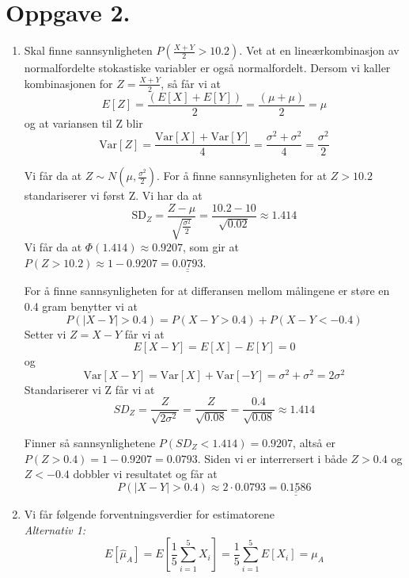 \documentclass[a4paper,11pt,norsk]{article}
\begin{document}
\section*{Oppgave 2.}
\begin{enumerate}
    \item Skal finne sannsynligheten $P(\frac{X + Y}{2} > 10.2)$. Vet at en lineærkombinasjon av normalfordelte stokastiske variabler er også normalfordelt. 
        Dersom vi kaller kombinasjonen for $Z = \frac{X + Y}{2}$, så får vi at
        \[
            E[Z] = \frac{\left(E[X] + E[Y]\right)}{2} = \frac{\left(\mu + \mu\right)}{2} = \mu
        \]
        og at variansen til Z blir
        \[
            \text{Var}[Z] = \frac{\text{Var}[X] + \text{Var}[Y]}{4} = \frac{\sigma^2 + \sigma^2}{4} = \frac{\sigma^2}{2}
        \]

        Vi får da at $Z \sim N(\mu, \frac{\sigma^2}{2})$. For å finne sannsynligheten for at $Z > 10.2$ standariserer vi først 
        Z. Vi har da at
        \[
            \text{SD}_Z = \frac{Z - \mu}{\sqrt{\frac{\sigma^2}{2}}} = \frac{10.2 - 10}{\sqrt{0.02}} \approx 1.414
        \]
        Vi får da at $\Phi(1.414) \approx 0.9207$, som gir at $P(Z > 10.2) \approx 1 - 0.9207 = \underline{\underline{0.0793}}$.
    
        For å finne sannsynligheten for at differansen mellom målingene er støre en 0.4 gram benytter vi at 
        \[
            P(|X - Y| > 0.4) = P(X - Y > 0.4) + P(X - Y < -0.4)
        \]
        Setter vi $Z = X - Y$ får vi at
        \[
            E[X - Y] = E[X] - E[Y] = 0
        \]
        og 
        \[
            \text{Var}[X - Y] = \text{Var}[X] + \text{Var}[-Y] = \sigma^2 + \sigma^2 = 2\sigma^2
        \]
        Standariserer vi Z får vi at 
        \[
            SD_Z = \frac{Z}{\sqrt{2\sigma^2}} = \frac{Z}{\sqrt{0.08}} = \frac{0.4}{\sqrt{0.08}} \approx 1.414
        \]

        Finner så sannsynlighetene $P(SD_Z < 1.414) = 0.9207$, altså er $P(Z > 0.4) = 1 - 0.9207 = 0.0793$. 
        Siden vi er interrersert i både $Z > 0.4$ og $Z < -0.4$ dobbler vi resultatet og får at 
        \[
            P(|X - Y| > 0.4) \approx 2 \cdot 0.0793 = \underline{\underline{0.1586}}
        \]
        
    \item Vi får følgende forventningsverdier for estimatorene \\
        \textit{Alternativ 1:}
        \[
            E[\hat{\mu}_A] = E\left[\frac{1}{5} \sum_{i=1}^{5}{X_i}\right] = \frac{1}{5} \sum_{i=1}^{5}{E[X_i]} = \mu_A
        \]


\end{enumerate}
\end{document}
